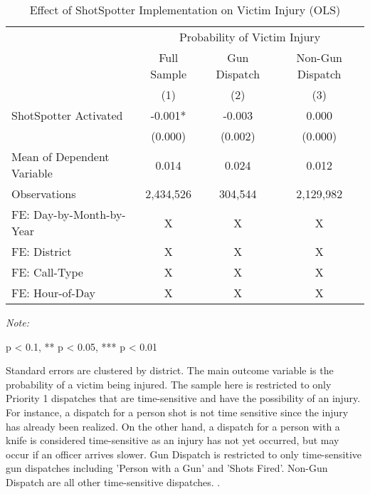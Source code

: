 \begin{table}[H]

\caption{\label{victim_table}Effect of ShotSpotter Implementation on Victim Injury (OLS)}
\centering
\begin{threeparttable}
\fontsize{11}{13}\selectfont
\begin{tabular}[t]{lccc}
\toprule
\multicolumn{1}{c}{ } & \multicolumn{3}{c}{Probability of Victim Injury} \\
\cmidrule(l{3pt}r{3pt}){2-4}
\multicolumn{1}{c}{ } & \multicolumn{1}{c}{Full Sample} & \multicolumn{1}{c}{Gun Dispatch} & \multicolumn{1}{c}{Non-Gun Dispatch} \\
\cmidrule(l{3pt}r{3pt}){2-2} \cmidrule(l{3pt}r{3pt}){3-3} \cmidrule(l{3pt}r{3pt}){4-4}
  & (1) & (2) & (3)\\
\midrule
ShotSpotter Activated & -0.001* & -0.003 & 0.000\\
 & (0.000) & (0.002) & (0.000)\\
Mean of Dependent Variable & 0.014 & 0.024 & 0.012\\
Observations & 2,434,526 & 304,544 & 2,129,982\\
FE: Day-by-Month-by-Year & X & X & X\\
\addlinespace
FE: District & X & X & X\\
FE: Call-Type & X & X & X\\
FE: Hour-of-Day & X & X & X\\
\bottomrule
\end{tabular}
\begin{tablenotes}
\item \textit{Note: } 
\item * p < 0.1, ** p < 0.05, *** p < 0.01
\item Standard errors are clustered by district.                       The main outcome variable is the probability of a victim being                      injured.                      The sample here is restricted to only Priority 1 dispatches that                      are time-sensitive and have the possibility of an injury. For instance,                      a dispatch for a person shot is not time sensitive since                      the injury has already been realized. On the other                      hand, a dispatch for a person with a knife is considered time-sensitive as                      an injury has not yet occurred, but may occur if an officer arrives slower.                      Gun Dispatch is restricted to only time-sensitive gun dispatches including                      'Person with a Gun' and 'Shots Fired'. Non-Gun Dispatch are all other                      time-sensitive dispatches.                   .                   
\end{tablenotes}
\end{threeparttable}
\end{table}
